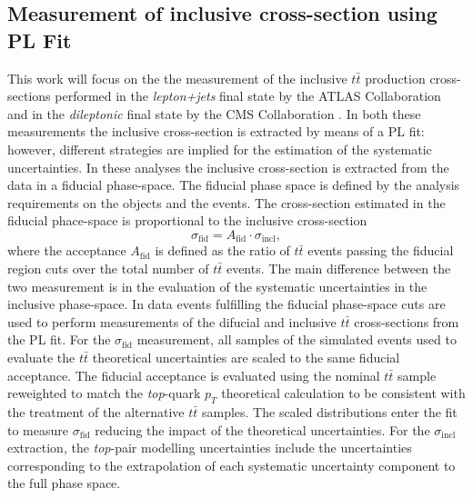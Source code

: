 \documentclass[12pt]{article}
\begin{document}
\subsection{Measurement of inclusive cross-section using PL Fit}
This work will focus on the the measurement of the inclusive $t\bar{t}$ production cross-sections performed in the \emph{lepton+jets} final state by the ATLAS Collaboration \cite{Aad_2020} and in the \emph{dileptonic} final state by the CMS Collaboration \cite{CMS_inclusive}. In both these measurements the inclusive cross-section is extracted by means of a PL fit: however, different strategies are implied for the estimation of the systematic uncertainties. 
In these analyses the inclusive cross-section is extracted from the data in a fiducial phase-space. The fiducial phase space is defined by the analysis requirements on the objects and the events. The cross-section estimated in the fiducial phace-space is proportional to the inclusive cross-section
\begin{equation}
\sigma_{\mathrm{fid}} = A_{\mathrm{fid}} \cdot \sigma_{\mathrm{incl}}, 
\end{equation}
where the acceptance $A_{\mathrm{fid}}$ is defined as the ratio of $t\bar{t}$ events passing the fiducial region cuts over the total number of $t\bar{t}$ events.
The main difference between the two measurement is in the evaluation of the systematic uncertainties in the inclusive phase-space. 
In \cite{Aad_2020} data events fulfilling the fiducial phase-space cuts are used to perform measurements of the difucial and inclusive $t\bar{t}$ cross-sections from the PL fit. For the $\sigma_{\mathrm{fid}}$ measurement, all samples of the simulated events used to evaluate the $t\bar{t}$ theoretical uncertainties are scaled to the same fiducial acceptance. 
The fiducial acceptance is evaluated using the nominal $t\bar{t}$ sample reweighted to match the \emph{top}-quark $p_T$ theoretical calculation to be consistent with the treatment of the alternative $t\bar{t}$ samples. The scaled distributions enter the fit to measure $\sigma_{\mathrm{fid}}$ reducing the impact of the theoretical uncertainties. For the $\sigma_{\mathrm{incl}}$ extraction, the \emph{top}-pair modelling uncertainties include the uncertainties corresponding to the extrapolation of each systematic uncertainty component to the full phase space. 
\end{document}
